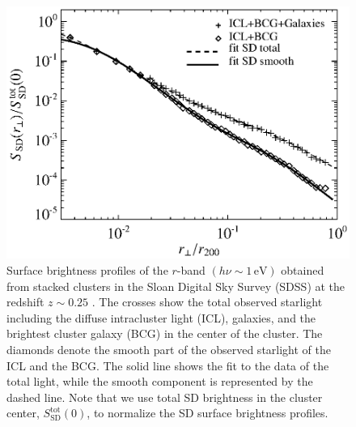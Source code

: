 \documentclass[10pt,aps,pra,reprint,amsmath,amsfonts,amssymb,showpacs,nofootinbib,floatfix]{revtex4-1}
\newcommand{\rmn}{\mathrm}
\newcommand{\sd}{\rmn{SD}}
\newcommand{\ev}{\rmn{eV}}
\begin{document}
\begin{figure}%
 \includegraphics[width=0.99\columnwidth]{figures/SB.photon.eps}
 \caption{Surface brightness profiles of the $r$-band $(h\nu\sim
   1\,\ev)$ obtained from stacked clusters in the Sloan Digital Sky
   Survey (SDSS) at the redshift $z \sim 0.25$ \protect
   \cite{2005MNRAS.358..949Z}. The crosses show the total observed
   starlight including the diffuse intracluster light (ICL), galaxies,
   and the brightest cluster galaxy (BCG) in the center of the
   cluster. The diamonds denote the smooth part of the observed
   starlight of the ICL and the BCG. The solid line shows the fit to
   the data of the total light, while the smooth component is
   represented by the dashed line. Note that we use total SD
   brightness in the cluster center, $S_\sd^\rmn{tot}(0)$, to
   normalize the SD surface brightness profiles.}
 \label{fig:SD_spatial}
\end{figure}
\end{document}

